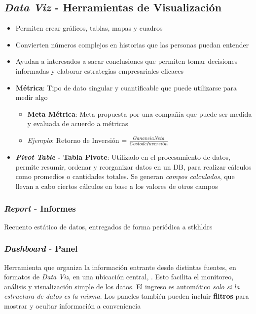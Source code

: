 \subsection{\textit{Data Viz} - Herramientas de Visualización}
\begin{itemize}
    \item {Permiten crear gráficos, tablas, mapas y cuadros}
    \item {Convierten números complejos en historias que las personas puedan entender}
    \item {Ayudan a interesados a sacar conclusiones que permiten tomar decisiones informadas y elaborar estrategias empresariales eficaces}
    \item {\textbf{Métrica}: Tipo de dato singular y cuantificable que puede utilizarse para medir algo
    \begin{itemize}
        \item {\textbf{Meta Métrica}: Meta propuesta por una compañía que puede ser medida y evaluada de acuerdo a métricas}
        \item {\textit{Ejemplo}: Retorno de Inversión = $\frac{Ganancia Neta}{Costo de Inversión}$}
    \end{itemize}}
    \item {\textbf{\textit{Pivot Table} - Tabla Pivote}: Utilizado en el procesamiento de datos, permite resumir, ordenar y reorganizar datos en un DB, para realizar cálculos como promedios o cantidades totales. Se generan \textit{campos calculados}, que llevan a cabo ciertos cálculos en base a los valores de otros campos}
\end{itemize}

\subsubsection{\textit{Report} - Informes}
Recuento estático de datos, entregados de forma periódica a \Gls{stkhldrs}

\subsubsection{\textit{Dashboard} - Panel}
Herramienta que organiza la información entrante desde distintas fuentes, en formatos de \textit{Data Viz}, en una ubicación central, . Esto facilita el monitoreo, análisis y visualización simple de los datos. El ingreso es automático \textit{solo si la estructura de datos es la misma}. Los paneles también pueden incluir \textbf{filtros} para mostrar y ocultar información a conveniencia
